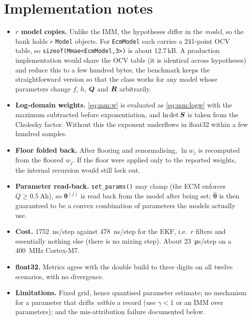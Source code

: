 \section{Implementation notes}
\begin{itemize}[leftmargin=1.4em]
\item \textbf{$r$ model copies.}  Unlike the IMM, the hypotheses differ in the \emph{model}, so the
      bank holds $r$ \texttt{Model} objects.  For \texttt{EcmModel} each carries a 241-point OCV
      table, so \texttt{sizeof(Mmae<EcmModel,3>)} is about 12.7\,kB.  A production
      implementation would share the OCV table (it is identical across hypotheses) and reduce this to
      a few hundred bytes; the benchmark keeps the straightforward version so that the class works
      for any model whose parameters change $f$, $h$, $\bm{Q}$ and $\bm{R}$ arbitrarily.
\item \textbf{Log-domain weights.}  \eqref{eq:mm:w} is evaluated as \eqref{eq:mm:logw} with the
      maximum subtracted before exponentiation, and $\ln\det\bm{S}$ is taken from the Cholesky factor.
      Without this the exponent underflows in float32 within a few hundred samples.
\item \textbf{Floor folded back.}  After flooring and renormalising, $\ln w_j$ is recomputed from the
      floored $w_j$.  If the floor were applied only to the reported weights, the internal recursion
      would still lock out.
\item \textbf{Parameter read-back.}  \texttt{set\_params()} may clamp (the ECM enforces
      $Q\ge\SI{0.5}{\ampere\hour}$), so $\bm\theta^{(j)}$ is read back from the model after being set;
      $\hat{\bm\theta}$ is then guaranteed to be a convex combination of parameters the models
      actually use.
\item \textbf{Cost.}  \SI{1752}{\nano\second}/step against \SI{478}{\nano\second}/step for the EKF,
      i.e.\ $r$ filters and essentially nothing else (there is no mixing step).  About
      \SI{23}{\micro\second}/step on a \SI{400}{\mega\hertz} Cortex-M7.
\item \textbf{float32.}  Metrics agree with the double build to three digits on all twelve scenarios,
      with no divergence.
\item \textbf{Limitations.}  Fixed grid, hence quantised parameter estimate; no mechanism for a
      parameter that drifts \emph{within} a record (use $\gamma<1$ or an IMM over parameters); and
      the mis-attribution failure documented below.
\end{itemize}

